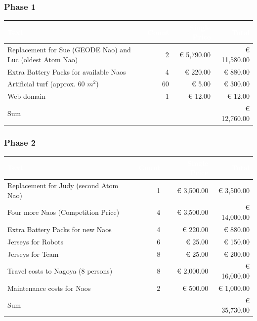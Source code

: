 \documentclass[12pt]{article}
\theoremstyle{definition}
\begin{document}
\subsubsection{Phase 1}
\begin{tabular}{|p{.51\linewidth}|r|r|r|}
\hline
\cellcolor[gray]{0.5}\textcolor{white}{Text} & \cellcolor[gray]{0.45}\textcolor{white}{Count} & \cellcolor[gray]{0.5}\textcolor{white}{Single Price} & \cellcolor[gray]{0.45}\textcolor{white}{Total} \\ \hline
Replacement for Sue (GEODE Nao) and Luc (oldest Atom Nao) & 2 & \euro{} 5,790.00 & \euro{} 11,580.00\\ \hline
Extra Battery Packs for available Naos & 4 & \euro{} 220.00 & \euro{} 880.00 \\ \hline
Artificial turf (approx. 60 $m^2$) & 60 & \euro{} 5.00 & \euro{} 300.00 \\ \hline
Web domain & 1 & \euro{} 12.00 & \euro{} 12.00 \\ \hline
Sum &  &  & \euro{} 12,760.00 \\ \hline
\end{tabular}

\subsubsection{Phase 2}
\begin{tabular}{|p{.51\linewidth}|r|r|r|}
\hline
\cellcolor[gray]{0.5}\textcolor{white}{Text} & \cellcolor[gray]{0.45}\textcolor{white}{Count} & \cellcolor[gray]{0.5}\textcolor{white}{Single Price} & \cellcolor[gray]{0.45}\textcolor{white}{Total} \\ \hline
Replacement for Judy (second Atom Nao) & 1 & \euro{} 3,500.00 & \euro{} 3,500.00\\ \hline
Four more Naos (Competition Price) & 4 & \euro{} 3,500.00 & \euro{} 14,000.00 \\ \hline
Extra Battery Packs for new Naos & 4 & \euro{} 220.00 & \euro{} 880.00 \\ \hline
Jerseys for Robots & 6 & \euro{} 25.00 & \euro{} 150.00 \\ \hline
Jerseys for Team & 8 & \euro{} 25.00 & \euro{} 200.00 \\ \hline
Travel costs to Nagoya (8 persons) & 8 & \euro{} 2,000.00 & \euro{} 16,000.00 \\ \hline
Maintenance costs for Naos & 2 & \euro{} 500.00 & \euro{} 1,000.00 \\ \hline
Sum &  &  & \euro{} 35,730.00 \\ \hline
\end{tabular}

{}
\end{document}
